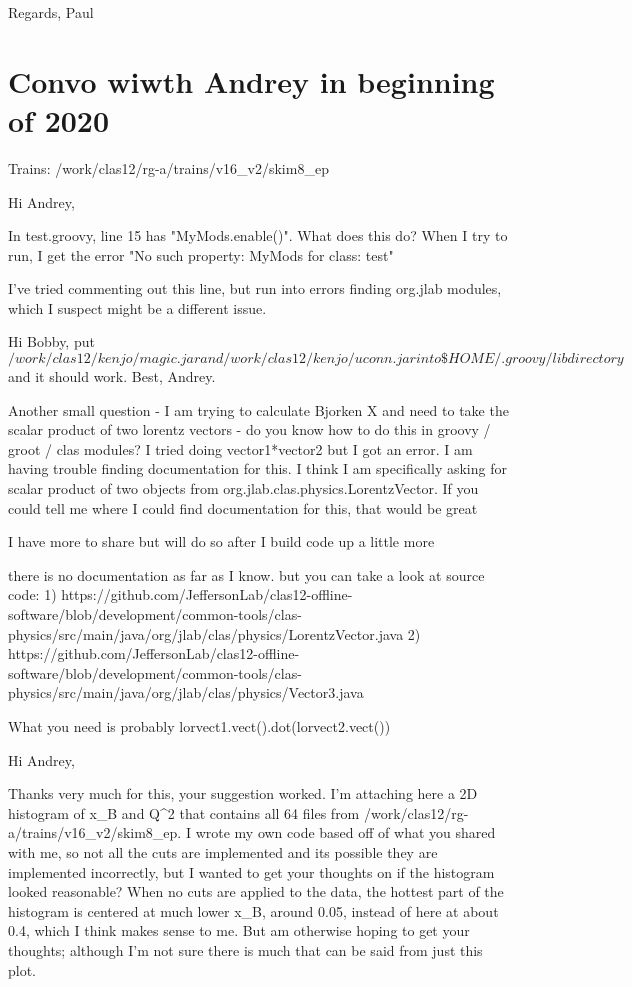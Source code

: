     Regards,
    Paul
    
    
    
    


\section{Convo wiwth Andrey in beginning of 2020}
Trains:
/work/clas12/rg-a/trains/v16_v2/skim8_ep

Hi Andrey,

In test.groovy, line 15 has "MyMods.enable()". What does this do? When I try to run, I get the error "No such property: MyMods for class: test"

I've tried commenting out this line, but run into errors finding org.jlab modules, which I suspect might be a different issue. 

Hi Bobby,
put $/work/clas12/kenjo/magic.jar and /work/clas12/kenjo/uconn.jar into \$HOME/.groovy/lib directory$ and it should work.
Best,
Andrey.

Another small question - I am trying to calculate Bjorken X and need to take the scalar product of two lorentz vectors - do you know how to do this in groovy / groot / clas modules? I tried doing vector1*vector2 but I got an error. I am having trouble finding documentation for this. I think I am specifically asking for scalar product of two objects from org.jlab.clas.physics.LorentzVector. If you could tell me where I could find documentation for this, that would be great

I have more to share but will do so after I build code up a little more


there is no documentation as far as I know. but you can take a look at source code:
1) https://github.com/JeffersonLab/clas12-offline-software/blob/development/common-tools/clas-physics/src/main/java/org/jlab/clas/physics/LorentzVector.java
2) https://github.com/JeffersonLab/clas12-offline-software/blob/development/common-tools/clas-physics/src/main/java/org/jlab/clas/physics/Vector3.java

What you need is probably lorvect1.vect().dot(lorvect2.vect())



Hi Andrey,

Thanks very much for this, your suggestion worked. I'm attaching here a 2D histogram of x_B and Q^2 that contains all 64 files from /work/clas12/rg-a/trains/v16_v2/skim8_ep. I  wrote my own code based off of what you shared with me, so not all the cuts are implemented and its possible they are implemented incorrectly, but I wanted to get your thoughts on if the histogram looked reasonable? When no cuts are applied to the data, the hottest part of the histogram is centered at much lower x_B, around 0.05, instead of here at about 0.4, which I think makes sense to me. But am otherwise hoping to get your thoughts; although I'm not sure there is much that can be said from just this plot.

